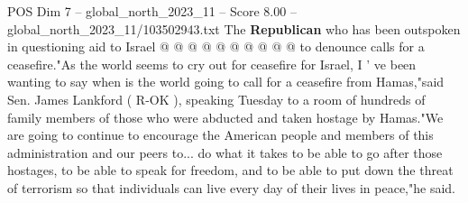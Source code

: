 \begin{textsample}{POS Dim 7 – global\_north\_2023\_11 – Score 8.00 – global\_north\_2023\_11/103502943.txt}
The \textbf{Republican} who has been outspoken in questioning aid to Israel @ @ @ @ @ @ @ @ @ @ to denounce calls for a ceasefire."As the world seems to cry out for ceasefire for Israel, I ' ve been wanting to say when is the world going to call for a ceasefire from Hamas,"said Sen.
James Lankford ( R-OK ), speaking Tuesday to a room of hundreds of family members of those who were abducted and taken hostage by Hamas."We are going to continue to encourage the American people and members of this administration and our peers to... do what it takes to be able to go after those hostages, to be able to speak for freedom, and to be able to put down the threat of terrorism so that individuals can live every day of their lives in peace,"he said.

\end{textsample}
